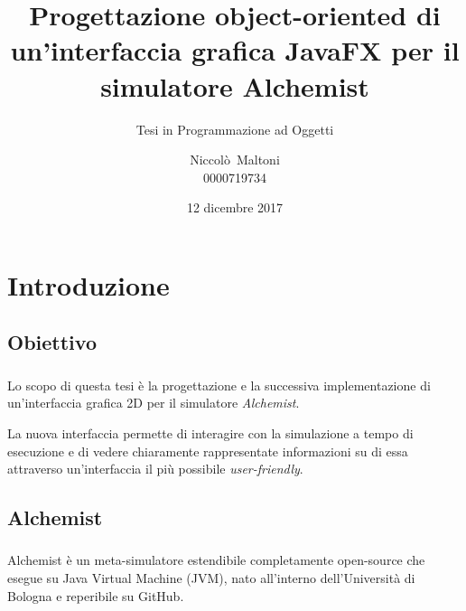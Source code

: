 \documentclass[%
]{beamer}
\title[Nuova GUI Alchemist in JavaFX]{%
    Progettazione object-oriented di un'interfaccia grafica %
    JavaFX per il simulatore Alchemist
}
\subtitle{Tesi in Programmazione ad Oggetti}
\author[Niccolò~Maltoni]{Niccolò~Maltoni\\0000719734}
\date{12 dicembre 2017}
\institute[]{%
    Alma Mater Studiorum - Università di Bologna\\%
    Campus di Cesena%
}
\newcommand{\engEmph}[1] {\emph{\foreignlanguage{english}#1}}
\begin{document}
    \begin{frame}
        \titlepage
    \end{frame}

    \section{Introduzione}\label{sec:intro}

    \subsection{Obiettivo}\label{subsec:obiettivo}
    \begin{frame}
        \frametitle{\insertsection}
        \framesubtitle{\insertsubsection}

        Lo scopo di questa tesi è la progettazione e la successiva implementazione di un'interfaccia grafica 2D per il simulatore \emph{Alchemist}.

        \medskip
        \pause

        La nuova interfaccia permette di interagire con la simulazione a tempo di esecuzione e di vedere chiaramente rappresentate informazioni su di essa attraverso un'interfaccia il più possibile \engEmph{user-friendly}.
    \end{frame}

    \subsection{Alchemist}\label{subsec:alchemist}
    \begin{frame}
        \frametitle{\insertsection}
        \framesubtitle{\insertsubsection}

        Alchemist è un meta-simulatore estendibile completamente open-source che esegue su Java Virtual Machine (JVM), nato all’interno dell’Università di Bologna e reperibile su GitHub.
    \end{frame}
\end{document}
